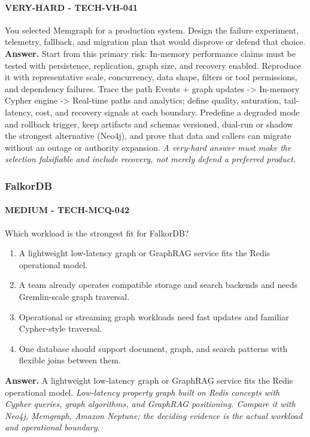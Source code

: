 \paragraph{VERY-HARD - TECH-VH-041} You selected Memgraph for a production system. Design the failure experiment, telemetry, fallback, and migration plan that would disprove or defend that choice.
\textbf{Answer.} Start from this primary risk: In-memory performance claims must be tested with persistence, replication, graph size, and recovery enabled. Reproduce it with representative scale, concurrency, data shape, filters or tool permissions, and dependency failures. Trace the path Events + graph updates -> In-memory Cypher engine -> Real-time paths and analytics; define quality, saturation, tail-latency, cost, and recovery signals at each boundary. Predefine a degraded mode and rollback trigger, keep artifacts and schemas versioned, dual-run or shadow the strongest alternative (Neo4j), and prove that data and callers can migrate without an outage or authority expansion.
\textit{A very-hard answer must make the selection falsifiable and include recovery, not merely defend a preferred product.}
\subsubsection*{FalkorDB}
\paragraph{MEDIUM - TECH-MCQ-042} Which workload is the strongest fit for FalkorDB?
\begin{enumerate}[label=\Alph*.]
\item A lightweight low-latency graph or GraphRAG service fits the Redis operational model.
\item A team already operates compatible storage and search backends and needs Gremlin-scale graph traversal.
\item Operational or streaming graph workloads need fast updates and familiar Cypher-style traversal.
\item One database should support document, graph, and search patterns with flexible joins between them.
\end{enumerate}
\textbf{Answer.} A lightweight low-latency graph or GraphRAG service fits the Redis operational model.
\textit{Low-latency property graph built on Redis concepts with Cypher queries, graph algorithms, and GraphRAG positioning. Compare it with Neo4j, Memgraph, Amazon Neptune; the deciding evidence is the actual workload and operational boundary.}

